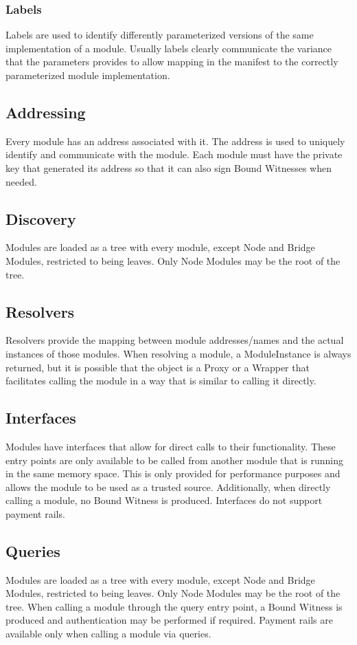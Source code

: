 \documentclass{article}
\begin{document}
\subsubsection{Labels}
Labels are used to identify differently parameterized versions of the same implementation of a module.  Usually labels clearly communicate the variance that the parameters provides to allow mapping in the manifest to the correctly parameterized module implementation.

\subsection{Addressing}
Every module has an address associated with it.  The address is used to uniquely identify and communicate with the module.  Each module must have the private key that generated its address so that it can also sign Bound Witnesses when needed.

\subsection{Discovery}
Modules are loaded as a tree with every module, except Node and Bridge Modules, restricted to being leaves.  Only Node Modules may be the root of the tree.

\subsection{Resolvers}
Resolvers provide the mapping between module addresses/names and the actual instances of those modules.  When resolving a module, a ModuleInstance is always returned, but it is possible that the object is a Proxy or a Wrapper that facilitates calling the module in a way that is similar to calling it directly.

\subsection{Interfaces}
Modules have interfaces that allow for direct calls to their functionality.  These entry points are only available to be called from another module that is running in the same memory space.  This is only provided for performance purposes and allows the module to be used as a trusted source.  Additionally, when directly calling a module, no Bound Witness is produced.  Interfaces do not support payment rails.

\subsection{Queries}
Modules are loaded as a tree with every module, except Node and Bridge Modules, restricted to being leaves.  Only Node Modules may be the root of the tree.  When calling a module through the query entry point, a Bound Witness is produced and authentication may be performed if required.  Payment rails are available only when calling a module via queries.
\end{document}
